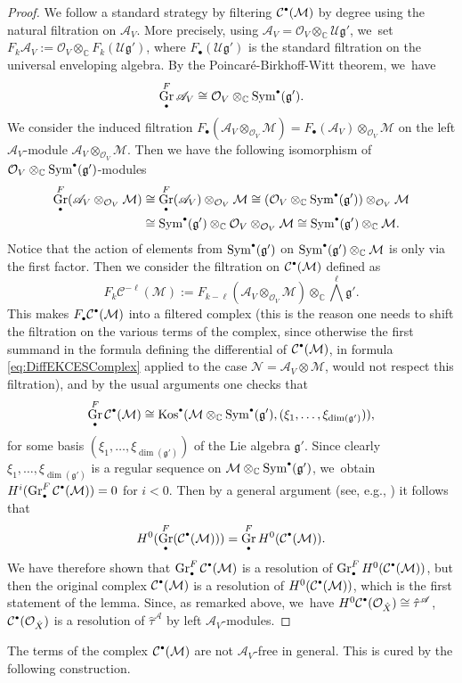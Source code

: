 \documentclass[JEP,XML,SOM,Unicode,published]{cedram}
\let\mathds\mathbb
\newcommand{\sbullet}{{\scriptscriptstyle\bullet}}
\newcommand{\csbullet}{{\raisebox{1pt}{$\sbullet$}}}
\newcommand{\dC}{{\mathds C}}\let\C\dC
\newcommand{\cA}{\mathscr{A}}
\newcommand{\cC}{\mathcal{C}}
\newcommand{\cM}{\mathcal{M}}
\newcommand{\cN}{\mathcal{N}}
\newcommand{\cO}{\mathcal{O}}\let\O\cO
\newcommand{\cU}{\mathcal{U}}\let\mcu\cU
\newcommand{\frg}{\mathfrak{g}}
\DeclareMathOperator{\gr}{\textup{Gr}}
\let\originalleft\left
\let\originalright\right
\renewcommand{\left}{\mathopen{}\mathclose\bgroup\originalleft}
\renewcommand{\right}{\aftergroup\egroup\originalright}
\begin{document}
\begin{proof}
We follow a standard strategy by filtering
$\cC^{\csbullet}(\cM)$ by degree using the natural
filtration on $\cA_V$. More precisely, using
$\cA_V=\cO_V\otimes_\dC\cU\frg'$, we~set $F_k\cA_V:=\cO_V\otimes_\dC F_k(\cU\frg')$, where $F_\sbullet(\cU\frg')$ is the standard filtration on the universal enveloping algebra. By the Poincaré-Birkhoff-Witt theorem, we~have
\[
\gr^F_\sbullet \cA_V \cong \cO_V\otimes_\dC \textup{Sym}^{\csbullet}(\frg').
\]
We consider the induced filtration
$F_\sbullet(\cA_V \otimes_{\cO_V} \cM) = F_\sbullet(\cA_V) \otimes_{\cO_V} \cM$ on the left $\cA_V$\nobreakdash-mod\-ule
$\cA_V \otimes_{\cO_V} \cM$. Then we have the following isomorphism of $\cO_V\otimes_\dC \textup{Sym}^{\csbullet}(\frg')$\nobreakdash-mod\-ules
\begin{align*}
\gr^F_\sbullet(\cA_V \otimes_{\cO_V} \cM) &\cong \gr^F_\sbullet(\cA_V) \otimes_{\cO_V} \cM
\cong
\left(\cO_V\otimes_\dC \textup{Sym}^{\csbullet}(\frg')\right) \otimes_{\cO_V} \cM
\\ &\cong
\textup{Sym}^{\csbullet}(\frg') \otimes_{\dC} \cO_V \otimes_{\cO_V} \cM
\cong
\textup{Sym}^{\csbullet}(\frg') \otimes_{\C} \cM.
\end{align*}
Notice that the action of elements from $\textup{Sym}^{\csbullet}(\frg')$ on
$\textup{Sym}^{\csbullet}(\frg') \otimes_{\C} \cM$ is only via the first factor.
Then we consider the filtration on $\cC^{\csbullet}(\cM)$ defined as
\[
F_k \cC^{-\ell}(\cM) :=
F_{k-\ell}(\cA_V \otimes_{\cO_V} \cM) \otimes_\dC \bigwedge^\ell \frg'.
\]
This makes $F_\sbullet\cC^{\csbullet}(\cM)$ into a filtered complex (this is the reason one needs to shift the filtration on the various terms of the complex, since otherwise the first summand in the formula defining the differential of $\cC^{\csbullet}(\cM)$, \ie in formula \eqref{eq:DiffEKCESComplex} applied to the case $\cN=\cA_V\otimes \cM$, would not respect this filtration), and by the usual arguments one checks that
\[
\gr^F_\sbullet \cC^{\csbullet}(\cM)
\cong \textup{Kos}^{\csbullet}(\cM \otimes_\dC \textup{Sym}^{\csbullet}(\frg'), (\xi_1,\ldots,\xi_{\dim(\frg')})),
\]
for some basis $(\xi_1,\ldots,\xi_{\dim(\frg')})$ of the Lie algebra $\frg'$. Since clearly
$\xi_1,\ldots,\xi_{\dim(\frg')}$ is a regular sequence on $\cM\otimes_\dC \textup{Sym}^{\csbullet}(\frg')$, we~obtain $H^i(\gr_\sbullet^F \cC^{\csbullet}(\cM)) = 0$ for $i<0$. Then by a general argument (see, e.g., \cite[Th.\,4.3.5]{SST}) it follows that
\[
H^0(\gr^F_\sbullet(\cC^{\csbullet}(\cM)))=\gr^F_\sbullet H^0(\cC^{\csbullet}(\cM)).
\]
We have therefore shown that $\gr^F_\sbullet \cC^{\csbullet}(\cM)$ is a resolution of
$\gr^F_\sbullet H^0(\cC^{\csbullet}(\cM))$, but then
the original complex $\cC^{\csbullet}(\cM)$ is a resolution of $H^0(\cC^{\csbullet}(\cM))$, which is the first statement of the lemma.
Since, as remarked above, we~have
$H^0\cC^{\csbullet}(\cO_{\hat{X}}) \cong \hat\tau^\cA$,
$\cC^{\csbullet}(\cO_{\hat{X}})$ is a resolution of
$\hat\tau^\cA$
by left $\cA_V$\nobreakdash-mod\-ules.
\end{proof}
The terms of the complex $\cC^{\csbullet}(\cM)$ are not $\cA_V$-free in general. This is cured by the following construction.
\end{document}
